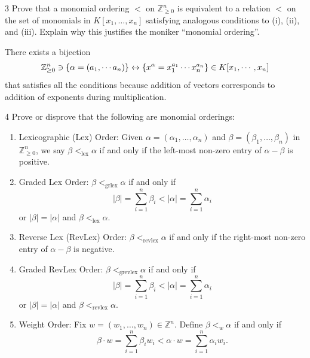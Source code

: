 \documentclass[Notebook.tex]{subfiles}
\begin{document}
\begin{problem}{3}
    Prove that a monomial ordering $<$ on $\mathbb{Z}_{\geq 0}^n$ is equivalent to a relation $<$ on the set of monomials in $K[x_1, \dots, x_n]$ satisfying analogous conditions to (i), (ii), and (iii). Explain why this justifies the moniker “monomial ordering”.
\end{problem}

\begin{solution}
    \bbni

    There exists a bijection 
    \[\mathbb Z^n_{\geq 0} \ni \{\alpha = (a_1, \cdots a_n)\} \leftrightarrow \{x^\alpha = x_1^{a_1} \cdots x_n^{a_n}\} \in K[x_1, \cdots, x_n]\]
    that satisfies all the conditions because addition of vectors corresponds to addition of exponents during multiplication. 
\end{solution}

\newpage 

\begin{problem}{4}
    Prove or disprove that the following are monomial orderings:
    \begin{enumerate}[label=(\alph*),ref=\theenumi\alph*]
        \item Lexicographic (Lex) Order: Given $\alpha = (\alpha_1, \dots, \alpha_n)$ and $\beta = (\beta_1, \dots, \beta_n)$ in $\mathbb{Z}_{\geq 0}^n$, we say $\beta <_{\text{lex}} \alpha$ if and only if the left-most non-zero entry of $\alpha - \beta$ is positive.
        
        \item Graded Lex Order: $\beta <_{\text{grlex}} \alpha$ if and only if
        \[
        |\beta| = \sum_{i=1}^n \beta_i < |\alpha| = \sum_{i=1}^n \alpha_i
        \]
        or $|\beta| = |\alpha|$ and $\beta <_{\text{lex}} \alpha$.

        \item Reverse Lex (RevLex) Order: $\beta <_{\text{revlex}} \alpha$ if and only if the right-most non-zero entry of $\alpha - \beta$ is negative.

        \item Graded RevLex Order: $\beta <_{\text{grevlex}} \alpha$ if and only if
        \[
        |\beta| = \sum_{i=1}^n \beta_i < |\alpha| = \sum_{i=1}^n \alpha_i
        \]
        or $|\beta| = |\alpha|$ and $\beta <_{\text{revlex}} \alpha$.

        \item Weight Order: Fix $w = (w_1, \dots, w_n) \in \mathbb{Z}^n$. Define $\beta <_w \alpha$ if and only if
        \[
        \beta \cdot w = \sum_{i=1}^n \beta_i w_i < \alpha \cdot w = \sum_{i=1}^n \alpha_i w_i.
        \]
    \end{enumerate}
\end{problem}
\end{document}
